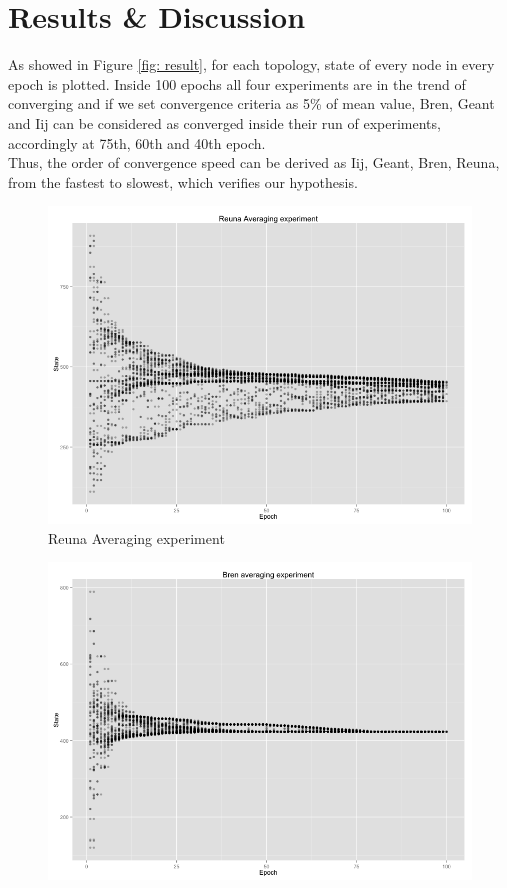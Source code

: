 \section{Results \& Discussion}
As showed in Figure \ref{fig: result}, for each topology, state of every node in every epoch is plotted. Inside 100 epochs all four experiments are in the trend of converging and if we set convergence criteria as 5\% of mean value, Bren, Geant and Iij can be considered as converged inside their run of experiments, accordingly at 75th, 60th and 40th epoch.\\
Thus, the order of convergence speed can be derived as Iij, Geant, Bren, Reuna, from the fastest to slowest, which verifies our hypothesis.
\begin{figure}[h!]
	\centering
    \begin{minipage}[t]{0.47\textwidth}
    \vspace{0pt}
    \includegraphics[width=\linewidth]{figures/Reuna.png}
    Reuna Averaging experiment
    \end{minipage}
    \begin{minipage}[t]{0.47\textwidth}
    \vspace{0pt}
    \includegraphics[width=\linewidth]{figures/Bren.png}

\end{minipage}
\end{figure}

